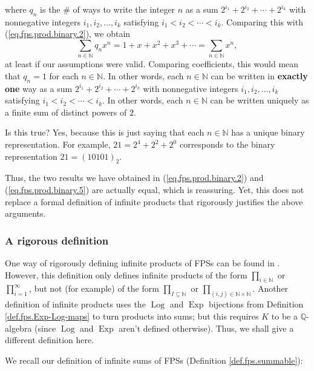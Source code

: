 where $q_{n}$ is the \# of ways to write the integer $n$ as a sum $2^{i_{1}%
}+2^{i_{2}}+\cdots+2^{i_{k}}$ with nonnegative integers $i_{1},i_{2}%
,\ldots,i_{k}$ satisfying $i_{1}<i_{2}<\cdots<i_{k}$. Comparing this with
(\ref{eq.fps.prod.binary.2}), we obtain%
\[
\sum_{n\in\mathbb{N}}q_{n}x^{n}=1+x+x^{2}+x^{3}+\cdots=\sum_{n\in\mathbb{N}%
}x^{n},
\]
at least if our assumptions were valid. Comparing coefficients, this would
mean that $q_{n}=1$ for each $n\in\mathbb{N}$. In other words, each
$n\in\mathbb{N}$ can be written in \textbf{exactly one} way as a sum
$2^{i_{1}}+2^{i_{2}}+\cdots+2^{i_{k}}$ with nonnegative integers $i_{1}%
,i_{2},\ldots,i_{k}$ satisfying $i_{1}<i_{2}<\cdots<i_{k}$. In other words,
each $n\in\mathbb{N}$ can be written uniquely as a finite sum of distinct
powers of $2$.

Is this true? Yes, because this is just saying that each $n\in\mathbb{N}$ has
a unique binary representation. For example, $21=2^{4}+2^{2}+2^{0}$
corresponds to the binary representation $21=\left(  10101\right)  _{2}$.

Thus, the two results we have obtained in (\ref{eq.fps.prod.binary.2}) and
(\ref{eq.fps.prod.binary.5}) are actually equal, which is reassuring. Yet,
this does not replace a formal definition of infinite products that rigorously
justifies the above arguments.

\subsubsection{\label{subsec.gf.prod.def}A rigorous definition}

One way of rigorously defining infinite products of FPSs can be found in
\cite[\S 7.5]{Loehr-BC}. However, this definition only defines infinite
products of the form $\prod_{i\in\mathbb{N}}$ or $\prod_{i=1}^{\infty}$, but
not (for example) of the form $\prod_{I\subseteq\mathbb{N}}$ or $\prod
_{\left(  i,j\right)  \in\mathbb{N}\times\mathbb{N}}$. Another definition of
infinite products uses the $\operatorname*{Log}$ and $\operatorname*{Exp}$
bijections from Definition \ref{def.fps.Exp-Log-maps} to turn products into
sums; but this requires $K$ to be a $\mathbb{Q}$-algebra (since
$\operatorname*{Log}$ and $\operatorname*{Exp}$ aren't defined otherwise).
Thus, we shall give a different definition here.

We recall our definition of infinite sums of FPSs (Definition
\ref{def.fps.summable}):

